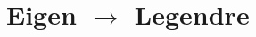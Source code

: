 \documentclass[a4paper,10pt]{article}
\begin{document}
  \section{Eigen $\rightarrow$ Legendre}


  

  

  
  
\end{document}
